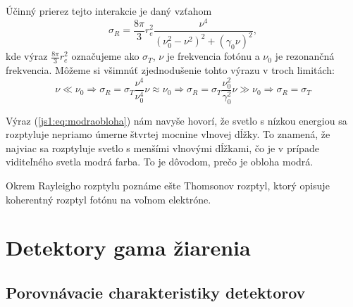 \documentclass[../../main.tex]{subfiles}
\begin{document}
Účinný prierez tejto interakcie je daný vzťahom
\begin{equation}
\sigma_R=\dfrac{8\pi}{3}r_e^2\dfrac{\nu^4}{(\nu_0^2-\nu^2)^2+(\gamma_0\nu)^2},
\end{equation}
kde výraz $\frac{8\pi}{3}r_e^2$ označujeme ako $\sigma_T$, $\nu$ je frekvencia fotónu a $\nu_0$ je rezonančná frekvencia. Môžeme si všimnúť zjednodušenie tohto výrazu v troch limitách:
\begin{subequations}
\begin{equation}
\nu \ll \nu_0 \Rightarrow \sigma_R=\sigma_T\dfrac{\nu^4}{\nu_0^4}
\label{js1:eq:modraobloha}
\end{equation}
\begin{equation}
\nu \approx \nu_0 \Rightarrow \sigma_R=\sigma_T\dfrac{\nu_0^2}{\gamma_0^2}
\end{equation}
\begin{equation}
\nu \gg \nu_0 \Rightarrow \sigma_R=\sigma_T
\end{equation}
\end{subequations}

Výraz (\ref{js1:eq:modraobloha}) nám navyše hovorí, že svetlo s nízkou energiou sa rozptyluje nepriamo úmerne štvrtej mocnine vlnovej dĺžky. To znamená, že najviac sa rozptyluje svetlo s menšími vlnovými dĺžkami, čo je v prípade viditeľného svetla modrá farba. To je dôvodom, prečo je obloha modrá.

Okrem Rayleigho rozptylu poznáme ešte Thomsonov rozptyl, ktorý opisuje koherentný rozptyl fotónu na voľnom elektróne.

\section{Detektory gama žiarenia}

\subsection{Porovnávacie charakteristiky detektorov}
\end{document}
